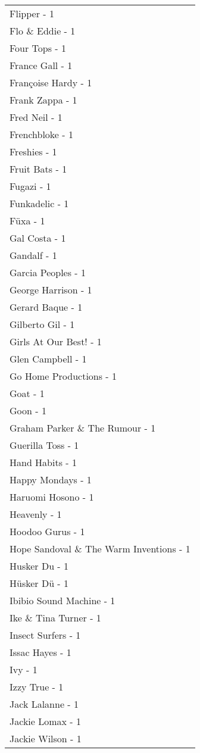 \documentclass[
]{article}
\begin{document}
\begin{longtable}{l}
Flipper - 1 \\ 
Flo \& Eddie - 1 \\ 
Four Tops - 1 \\ 
France Gall - 1 \\ 
Françoise Hardy - 1 \\ 
Frank Zappa - 1 \\ 
Fred Neil - 1 \\ 
Frenchbloke - 1 \\ 
Freshies - 1 \\ 
Fruit Bats - 1 \\ 
Fugazi - 1 \\ 
Funkadelic - 1 \\ 
Füxa - 1 \\ 
Gal Costa - 1 \\ 
Gandalf - 1 \\ 
Garcia Peoples - 1 \\ 
George Harrison - 1 \\ 
Gerard Baque - 1 \\ 
Gilberto Gil - 1 \\ 
Girls At Our Best! - 1 \\ 
Glen Campbell - 1 \\ 
Go Home Productions - 1 \\ 
Goat - 1 \\ 
Goon - 1 \\ 
Graham Parker \& The Rumour - 1 \\ 
Guerilla Toss - 1 \\ 
Hand Habits - 1 \\ 
Happy Mondays - 1 \\ 
Haruomi Hosono - 1 \\ 
Heavenly - 1 \\ 
Hoodoo Gurus - 1 \\ 
Hope Sandoval \& The Warm Inventions - 1 \\ 
Husker Du - 1 \\ 
Hüsker Dü - 1 \\ 
Ibibio Sound Machine - 1 \\ 
Ike \& Tina Turner - 1 \\ 
Insect Surfers - 1 \\ 
Issac Hayes - 1 \\ 
Ivy - 1 \\ 
Izzy True - 1 \\ 
Jack Lalanne - 1 \\ 
Jackie Lomax - 1 \\ 
Jackie Wilson - 1 \\ 

\end{longtable}
\end{document}
